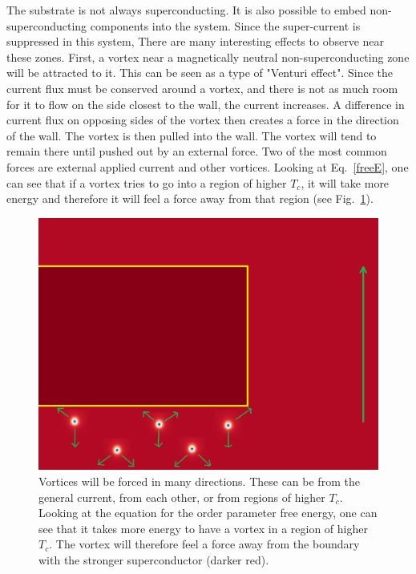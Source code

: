 The substrate is not always superconducting. It is also possible to embed non-superconducting components into the system. Since the super-current is suppressed in this system, There are many interesting effects to observe near these zones. First, a vortex near a magnetically neutral non-superconducting zone will be attracted to it. This can be seen as a type of "Venturi effect". Since the current flux must be conserved around a vortex, and there is not as much room for it to flow on the side closest to the wall, the current increases. A difference in current flux on opposing sides of the vortex then creates a force in the direction of the wall. The vortex is then pulled into the wall. The vortex will tend to remain there until pushed out by an external force. Two of the most common forces are external applied current and other vortices. Looking at Eq.~\ref{freeE}, one can see that if a vortex tries to go into a region of higher $T_c$, it will take more energy and therefore it will feel a force away from that region (see Fig.~\ref{forces}).

\begin{figure}[htbp]
\begin{center}
\includegraphics[scale=.50]{forces.png}
\caption{Vortices will be forced in many directions. These can be from the general current, from each other, or from regions of higher $T_c$. Looking at the equation for the order parameter free energy, one can see that it takes more energy to have a vortex in a region of higher $T_c$. The vortex will therefore feel a force away from the boundary with the stronger superconductor (darker red).}
\label{forces}
\end{center}
\end{figure}


